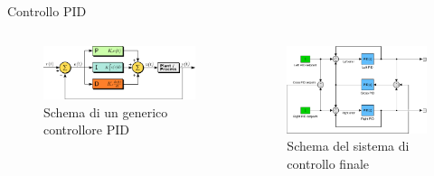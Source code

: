 \documentclass{beamer}
\begin{document}
\begin{tframe}{Controllo PID}
\begin{columns}
    \begin{column}{0.5\textwidth}
        \begin{figure}
                \centering
                \includegraphics[width=\columnwidth]{img/pid.png}
                \caption{Schema di un generico controllore PID}
            \end{figure}
    \end{column}

    \begin{column}{0.5\textwidth}
        \begin{center}
            \begin{figure}
                \centering
                \includegraphics[width=\columnwidth]{img/crosspid.pdf}
                \caption{Schema del sistema di controllo finale}
            \end{figure}
        \end{center}
    \end{column}
\end{columns}
\end{tframe}
\end{document}
